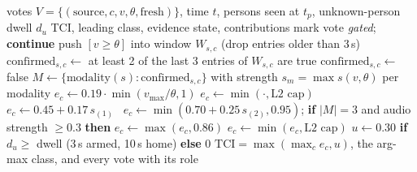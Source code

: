 \begin{algorithm}[htbp]
\caption{Confirmed per-class evidence and the Threat Confidence Index}
\label{alg:evidence}
\small
\begin{algorithmic}[1]
\Require votes $V=\{(\text{source}, c, v, \theta, \text{fresh})\}$, time $t$, persons seen at $t_p$, unknown-person dwell $d_u$
\Ensure TCI, leading class, evidence state, contributions
   mark vote \emph{gated}; \textbf{continue} \EndIf
   push $[v \geq \theta]$ into window $W_{s,c}$ (drop entries older than 3\,s) \EndIf
  \State $\text{confirmed}_{s,c} \gets$ at least 2 of the last 3 entries of $W_{s,c}$ are true
   $\text{confirmed}_{s,c} \gets$ false  \EndIf
\EndFor
{}
  \State $M \gets \{\text{modality}(s) : \text{confirmed}_{s,c}\}$ with strength $s_m = \max s(v,\theta)$ per modality
   $e_c \gets 0.19 \cdot \min(v_{\max}/\theta, 1)$
   $e_c \gets \min(\cdot, \text{L2 cap})$ 
   $e_c \gets 0.45 + 0.17\, s_{(1)}$
  \Else\ $e_c \gets \min(0.70 + 0.25\, s_{(2)}, 0.95)$; \textbf{if} $|M|=3$ and audio strength $\geq 0.3$ \textbf{then} $e_c \gets \max(e_c, 0.86)$
  \EndIf
   $e_c \gets \min(e_c, \text{L2 cap})$ \EndIf
\EndFor
\State $u \gets 0.30$ \textbf{if} $d_u \geq$ dwell (3\,s armed, 10\,s home) \textbf{else} $0$
\State \Return $\mathrm{TCI} = \max(\max_c e_c, u)$, the arg-max class, and every vote with its role
\end{algorithmic}
\end{algorithm}

